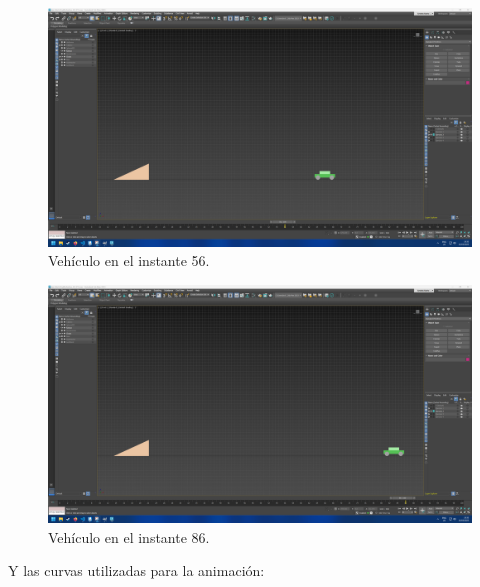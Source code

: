\documentclass{article}
\begin{document}
 \begin{figure}[H]
    \centering
    \includegraphics[width=\textwidth]{imagenes/Ejercicio2/keyframes/56.png}
    \caption{Vehículo en el instante 56.}
 \end{figure}
 \begin{figure}[H]
    \centering
    \includegraphics[width=\textwidth]{imagenes/Ejercicio2/keyframes/86.png}
    \caption{Vehículo en el instante 86.}
 \end{figure}


Y las curvas utilizadas para la animación:
\end{document}
